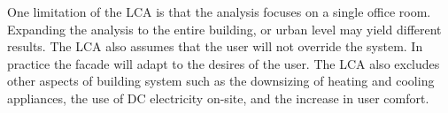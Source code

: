One limitation of the LCA is that the analysis focuses on a single office room. Expanding the analysis to the entire building, or urban level may yield different results. The LCA also assumes that the user will not override the system. In practice the facade will adapt to the desires of the user. 
The LCA also excludes other aspects of building system such as the downsizing of heating and cooling appliances, the use of DC electricity on-site, and the increase in user comfort.



